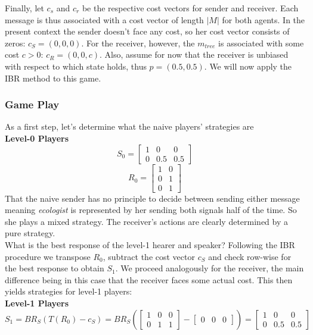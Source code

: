 \documentclass{article}
\begin{document}
Finally, let $c_s$ and $c_r$ be the respective cost vectors for sender and receiver. Each message is thus associated with a cost vector of length $|M|$ for both agents. In the present context the sender doesn't face any cost, so her cost vector consists of zeros: $c_S=(0,0,0)$. For the receiver, however, the $m_{tree}$ is associated with some cost $c>0$: $c_R=(0,0,c)$.
Also, assume for now that the receiver is unbiased with respect to which state holds, thus $p=(0.5,0.5)$.
We will now apply the IBR method to this game. 

\subsubsection{Game Play}
As a first step, let's determine what the naive players' strategies are\\
\textbf{Level-0 Players}\\
\begin{equation*}
S_0=
\begin{bmatrix}
1 & 0 & 0\\
0 & 0.5 & 0.5
\end{bmatrix}
\end{equation*}
\begin{equation*}
R_0=
\begin{bmatrix}
1 & 0\\
0 & 1\\
0 & 1
\end{bmatrix}
\end{equation*}
That the naive sender has no principle to decide between sending either message meaning \textit{ecologist} is represented by her sending both signals half of the time. So she plays a mixed strategy. The receiver's actions are clearly determined by a pure strategy.\\
What is the best response of the level-1 hearer and speaker? Following the IBR procedure we transpose $R_0$, subtract the cost vector $c_S$ and check row-wise for the best response to obtain $S_1$. We proceed analogously for the receiver, the main difference being in this case that the receiver faces some actual cost. This then yields strategies for level-1 players:\\
\textbf{Level-1 Players}\\
\begin{equation*}
S_1= BR_S(T(R_0)-c_S)=
BR_S(
\begin{bmatrix}
1 & 0 & 0\\
0 & 1 & 1
\end{bmatrix}
-
\begin{bmatrix}
0 & 0 & 0
\end{bmatrix}
)
=
\begin{bmatrix}
1 & 0 & 0\\
0 & 0.5 & 0.5
\end{bmatrix}
\end{equation*}
\end{document}
